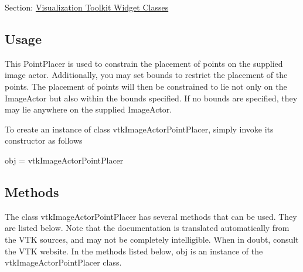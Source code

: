 Section\-: \hyperlink{sec_vtkwidgets}{Visualization Toolkit Widget Classes} \hypertarget{vtkwidgets_vtkxyplotwidget_Usage}{}\subsection{Usage}\label{vtkwidgets_vtkxyplotwidget_Usage}
This Point\-Placer is used to constrain the placement of points on the supplied image actor. Additionally, you may set bounds to restrict the placement of the points. The placement of points will then be constrained to lie not only on the Image\-Actor but also within the bounds specified. If no bounds are specified, they may lie anywhere on the supplied Image\-Actor.

To create an instance of class vtk\-Image\-Actor\-Point\-Placer, simply invoke its constructor as follows \begin{DoxyVerb}  obj = vtkImageActorPointPlacer
\end{DoxyVerb}
 \hypertarget{vtkwidgets_vtkxyplotwidget_Methods}{}\subsection{Methods}\label{vtkwidgets_vtkxyplotwidget_Methods}
The class vtk\-Image\-Actor\-Point\-Placer has several methods that can be used. They are listed below. Note that the documentation is translated automatically from the V\-T\-K sources, and may not be completely intelligible. When in doubt, consult the V\-T\-K website. In the methods listed below, {\ttfamily obj} is an instance of the vtk\-Image\-Actor\-Point\-Placer class. 
